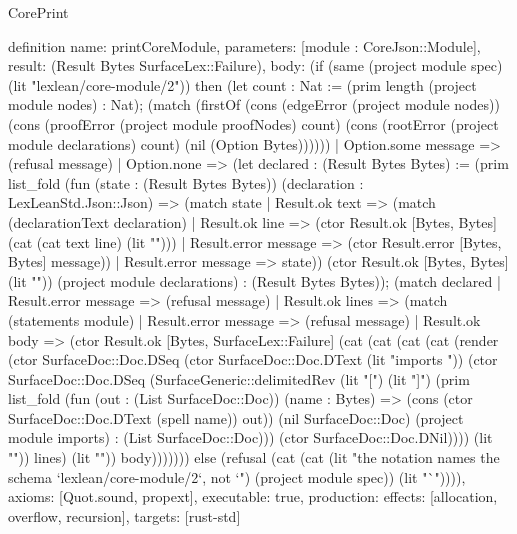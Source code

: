 \begin{lexlean}{CorePrint}
\begin{semanticmodule}
definition{
  name: printCoreModule,
  parameters: [module : CoreJson::Module],
  result: (Result Bytes SurfaceLex::Failure),
  body: (if (same (project module spec) (lit "lexlean/core-module/2")) then (let count : Nat := (prim length (project module nodes) : Nat); (match (firstOf (cons (edgeError (project module nodes)) (cons (proofError (project module proofNodes) count) (cons (rootError (project module declarations) count) (nil (Option Bytes))))))
    | Option.some message => (refusal message)
    | Option.none => (let declared : (Result Bytes Bytes) := (prim list_fold (fun (state : (Result Bytes Bytes)) (declaration : LexLeanStd.Json::Json) => (match state
      | Result.ok text => (match (declarationText declaration)
        | Result.ok line => (ctor Result.ok [Bytes, Bytes] (cat (cat text line) (lit "\n")))
        | Result.error message => (ctor Result.error [Bytes, Bytes] message))
      | Result.error message => state)) (ctor Result.ok [Bytes, Bytes] (lit "")) (project module declarations) : (Result Bytes Bytes)); (match declared
      | Result.error message => (refusal message)
      | Result.ok lines => (match (statements module)
        | Result.error message => (refusal message)
        | Result.ok body => (ctor Result.ok [Bytes, SurfaceLex::Failure] (cat (cat (cat (cat (render (ctor SurfaceDoc::Doc.DSeq (ctor SurfaceDoc::Doc.DText (lit "imports ")) (ctor SurfaceDoc::Doc.DSeq (SurfaceGeneric::delimitedRev (lit "[") (lit "]") (prim list_fold (fun (out : (List SurfaceDoc::Doc)) (name : Bytes) => (cons (ctor SurfaceDoc::Doc.DText (spell name)) out)) (nil SurfaceDoc::Doc) (project module imports) : (List SurfaceDoc::Doc))) (ctor SurfaceDoc::Doc.DNil)))) (lit "\n\n")) lines) (lit "\n")) body))))))) else (refusal (cat (cat (lit "the notation names the schema `lexlean/core-module/2`, not `") (project module spec)) (lit "`")))),
  axioms: [Quot.sound, propext],
  executable: true,
  production: {effects: [allocation, overflow, recursion], targets: [rust-std]}
}
\end{semanticmodule}
\end{lexlean}
